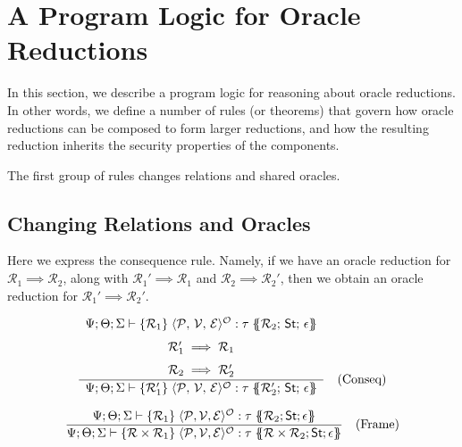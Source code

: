 \section{A Program Logic for Oracle Reductions}

In this section, we describe a program logic for reasoning about oracle reductions. In other words, we define a number of rules (or theorems) that govern how oracle reductions can be composed to form larger reductions, and how the resulting reduction inherits the security properties of the components.

The first group of rules changes relations and shared oracles.

\subsection{Changing Relations and Oracles}

Here we express the consequence rule.  Namely, if we have an oracle reduction for 
\(\mathcal{R}_1 \implies \mathcal{R}_2\), along with 
\(\mathcal{R}_1' \implies \mathcal{R}_1\) and \(\mathcal{R}_2 \implies \mathcal{R}_2'\),
then we obtain an oracle reduction for \(\mathcal{R}_1' \implies \mathcal{R}_2'\).

\[
\frac{%
  \begin{array}{c}
    \Psi; \Theta; \Sigma \vdash \{\mathcal{R}_1\}\; \langle \mathcal{P},\, \mathcal{V},\, \mathcal{E}\rangle^{\mathcal{O}} : \tau \;\{\!\!\{\mathcal{R}_2; \,\mathsf{St};\, \epsilon\}\!\!\} \\[1.5ex]
    \mathcal{R}_1' \implies \mathcal{R}_1 \\[1.5ex]
    \mathcal{R}_2 \implies \mathcal{R}_2'
  \end{array}%
}{%
  \Psi; \Theta; \Sigma \vdash \{\mathcal{R}_1'\}\; \langle \mathcal{P},\, \mathcal{V},\, \mathcal{E}\rangle^{\mathcal{O}} : \tau \;\{\!\!\{\mathcal{R}_2'; \,\mathsf{St};\, \epsilon\}\!\!\}
} \quad \text{(Conseq)}
\]


\[
\frac{%
  \Psi; \Theta; \Sigma \vdash \{\mathcal{R}_1\} \; \langle\mathcal{P}, \mathcal{V}, \mathcal{E}\rangle^{\mathcal{O}} : \tau \; \{\!\!\{\mathcal{R}_2; \mathsf{St}; \epsilon\}\!\!\}
}{%
  \Psi; \Theta; \Sigma \vdash \{\mathcal{R} \times \mathcal{R}_1\} \; \langle\mathcal{P}, \mathcal{V}, \mathcal{E}\rangle^{\mathcal{O}} : \tau \; \{\!\!\{\mathcal{R} \times \mathcal{R}_2; \mathsf{St}; \epsilon\}\!\!\}
} \quad \text{(Frame)}
\]

